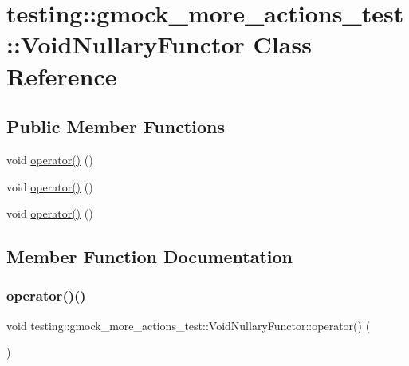 \hypertarget{classtesting_1_1gmock__more__actions__test_1_1_void_nullary_functor}{}\section{testing\+::gmock\+\_\+more\+\_\+actions\+\_\+test\+::Void\+Nullary\+Functor Class Reference}
\label{classtesting_1_1gmock__more__actions__test_1_1_void_nullary_functor}
\subsection*{Public Member Functions}
\begin{DoxyCompactItemize}
\item 
void \mbox{\hyperlink{classtesting_1_1gmock__more__actions__test_1_1_void_nullary_functor_a3b71273472780abc47927c57af209204}{operator()}} ()
\item 
void \mbox{\hyperlink{classtesting_1_1gmock__more__actions__test_1_1_void_nullary_functor_a3b71273472780abc47927c57af209204}{operator()}} ()
\item 
void \mbox{\hyperlink{classtesting_1_1gmock__more__actions__test_1_1_void_nullary_functor_a3b71273472780abc47927c57af209204}{operator()}} ()
\end{DoxyCompactItemize}


\subsection{Member Function Documentation}
\mbox{\label{classtesting_1_1gmock__more__actions__test_1_1_void_nullary_functor_a3b71273472780abc47927c57af209204}} 
\subsubsection{\texorpdfstring{operator()()}{operator()()}\hspace{0.1cm}{\footnotesize\ttfamily [1/3]}}
{\footnotesize\ttfamily void testing\+::gmock\+\_\+more\+\_\+actions\+\_\+test\+::\+Void\+Nullary\+Functor\+::operator() (\begin{DoxyParamCaption}{ }\end{DoxyParamCaption})\hspace{0.3cm}{\ttfamily [inline]}}

